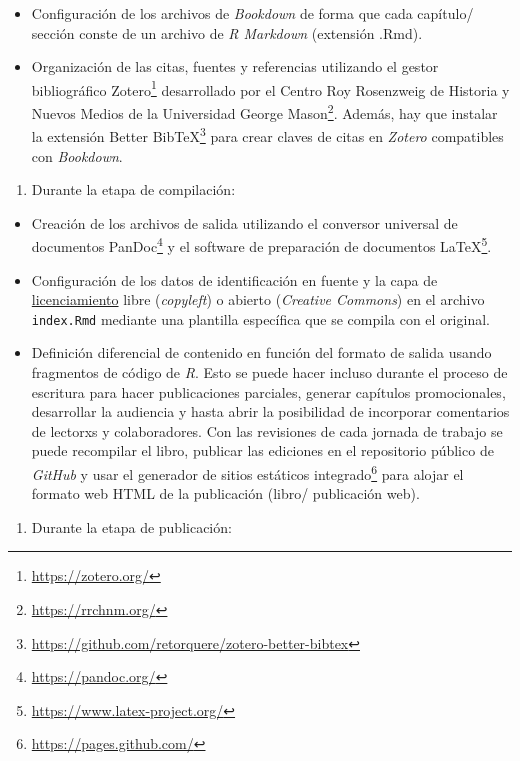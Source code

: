 \documentclass[
]{krantz}
\DeclareRobustCommand{\href}[2]{#2\footnote{\url{#1}}}
\providecommand{\tightlist}{%
  \setlength{\itemsep}{0pt}\setlength{\parskip}{0pt}}
\begin{document}
\begin{itemize}
\item
  Configuración de los archivos de \emph{Bookdown} de forma que cada capítulo/ sección conste de un archivo de \emph{R Markdown} (extensión .Rmd).
\item
  Organización de las citas, fuentes y referencias utilizando el gestor bibliográfico \href{https://zotero.org/}{Zotero} desarrollado por el \href{https://rrchnm.org/}{Centro Roy Rosenzweig de Historia y Nuevos Medios de la Universidad George Mason}. Además, hay que instalar la extensión \href{https://github.com/retorquere/zotero-better-bibtex}{Better BibTeX} para crear claves de citas en \emph{Zotero} compatibles con \emph{Bookdown}.
\end{itemize}

\begin{enumerate}
\def\labelenumi{\arabic{enumi}.}
\setcounter{enumi}{1}
\tightlist
\item
  Durante la etapa de compilación:
\end{enumerate}

\begin{itemize}
\item
  Creación de los archivos de salida utilizando el conversor universal de documentos \href{https://pandoc.org/}{PanDoc} y el software de preparación de documentos \href{https://www.latex-project.org/}{LaTeX}.
\item
  Configuración de los datos de identificación en fuente y la capa de \protect\hyperlink{licencias}{licenciamiento} libre (\emph{copyleft}) o abierto (\emph{Creative Commons}) en el archivo \texttt{index.Rmd} mediante una plantilla específica que se compila con el original.
\item
  Definición diferencial de contenido en función del formato de salida usando fragmentos de código de \emph{R}. Esto se puede hacer incluso durante el proceso de escritura para hacer publicaciones parciales, generar capítulos promocionales, desarrollar la audiencia y hasta abrir la posibilidad de incorporar comentarios de lectorxs y colaboradores. Con las revisiones de cada jornada de trabajo se puede recompilar el libro, publicar las ediciones en el repositorio público de \emph{GitHub} y usar el \href{https://pages.github.com/}{generador de sitios estáticos integrado} para alojar el formato web HTML de la publicación (libro/ publicación web).
\end{itemize}

\begin{enumerate}
\def\labelenumi{\arabic{enumi}.}
\setcounter{enumi}{2}
\tightlist
\item
  Durante la etapa de publicación:
\end{enumerate}
\end{document}
